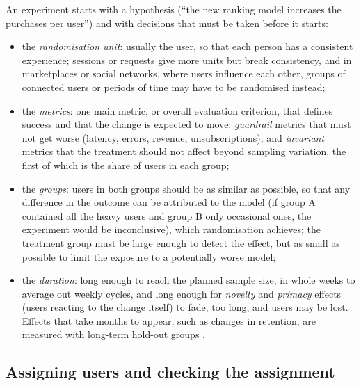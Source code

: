 An experiment starts with a hypothesis (``the new ranking model increases the purchases per user'') and with decisions that must
be taken before it starts:
\begin{itemize}
  \item the \emph{randomisation unit}: usually the user, so that each person has a consistent experience; sessions or requests
        give more units but break consistency, and in marketplaces or social networks, where users influence each other,
        groups of connected users or periods of time may have to be randomised instead;
  \item the \emph{metrics}: one main metric, or overall evaluation criterion, that defines success and that the change is expected
        to move; \emph{guardrail} metrics that must not get worse (latency, errors, revenue, unsubscriptions); and \emph{invariant}
        metrics that the treatment should not affect beyond sampling variation, the first of which is the share of users
        in each group;
  \item the \emph{groups}: users in both groups should be as similar as possible, so that any difference in the outcome can be
        attributed to the model (if group A contained all the heavy users and group B only
        occasional ones, the experiment would be inconclusive), which randomisation achieves; the treatment group must be large
        enough to detect the effect, but as small as possible to limit the exposure to a potentially worse model;
  \item the \emph{duration}: long enough to reach the planned sample size, in whole weeks to average out weekly cycles, and long
        enough for \emph{novelty} and \emph{primacy} effects (users reacting to the change itself) to fade; too long, and users may
        be lost. Effects that take months to appear, such as changes in retention, are measured with long-term hold-out groups
        \citep{hohnhold2015focusing}.
\end{itemize}

\subsection{Assigning users and checking the assignment}

